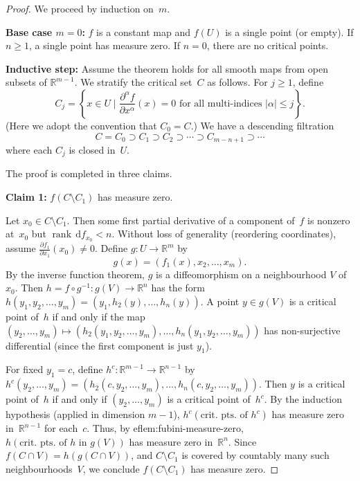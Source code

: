\documentclass[12pt,a4paper,openany]{book}
\theoremstyle{definition}
\theoremstyle{remark}
\newcommand{\R}{\mathbb{R}}
\newcommand{\dd}{\,\mathrm{d}}
\newcommand{\abs}[1]{\left\lvert #1 \right\rvert}
\newcommand{\set}[1]{\left\{ #1 \right\}}
\begin{document}
\begin{proof}
We proceed by induction on~$m$.

\medskip\noindent\textbf{Base case $m = 0$:} $f$ is a constant map
and $f(U)$ is a single point (or empty).  If $n\ge 1$, a single point
has measure zero.  If $n = 0$, there are no critical points.

\medskip\noindent\textbf{Inductive step:} Assume the theorem holds for
all smooth maps from open subsets of $\R^{m-1}$.  We stratify the
critical set~$C$ as follows.  For $j\ge 1$, define
\[
  C_j = \set{x\in U \;\Big|\; \frac{\partial^\alpha f}{\partial x^\alpha}(x) = 0
  \text{ for all multi-indices } \abs{\alpha}\le j}.
\]
(Here we adopt the convention that $C_0 = C$.)
We have a descending filtration
\[
  C = C_0 \supset C_1 \supset C_2 \supset \cdots \supset C_{m-n+1} \supset\cdots
\]
where each $C_j$ is closed in~$U$.

The proof is completed in three claims.

\medskip\noindent\textbf{Claim 1:} $f(C\setminus C_1)$ has measure zero.

Let $x_0\in C\setminus C_1$.  Then some first partial derivative of a
component of~$f$ is nonzero at~$x_0$ but $\operatorname{rank}\dd f_{x_0}<n$.
Without loss of generality (reordering coordinates), assume
$\frac{\partial f_1}{\partial x_1}(x_0)\ne 0$.  Define
$g\colon U\to\R^m$ by
\[
  g(x) = (f_1(x), x_2, \dots, x_m).
\]
By the inverse function theorem, $g$ is a diffeomorphism on a
neighbourhood $V$ of~$x_0$.  Then $h = f\circ g^{-1}\colon g(V)\to\R^n$
has the form $h(y_1,y_2,\dots,y_m) = (y_1, h_2(y),\dots,h_n(y))$.
A point $y\in g(V)$ is a critical point of~$h$ if and only if the map
$(y_2,\dots,y_m)\mapsto (h_2(y_1,y_2,\dots,y_m),\dots,h_n(y_1,y_2,\dots,y_m))$
has non-surjective differential (since the first component is just
$y_1$).

For fixed $y_1 = c$, define $h^c\colon\R^{m-1}\to\R^{n-1}$ by
$h^c(y_2,\dots,y_m) = (h_2(c,y_2,\dots,y_m),\dots,h_n(c,y_2,\dots,y_m))$.
Then $y$ is a critical point of~$h$ if and only if $(y_2,\dots,y_m)$ is
a critical point of~$h^c$.  By the induction hypothesis (applied in
dimension $m-1$), $h^c(\text{crit.\ pts.\ of } h^c)$ has measure zero
in~$\R^{n-1}$ for each~$c$.  Thus, by 
ef{lem:fubini-measure-zero},
$h(\text{crit.\ pts.\ of }h\text{ in }g(V))$ has measure zero in~$\R^n$.
Since $f(C\cap V) = h(g(C\cap V))$, and $C\setminus C_1$ is covered
by countably many such neighbourhoods~$V$, we conclude
$f(C\setminus C_1)$ has measure zero.


\end{proof}
\end{document}
